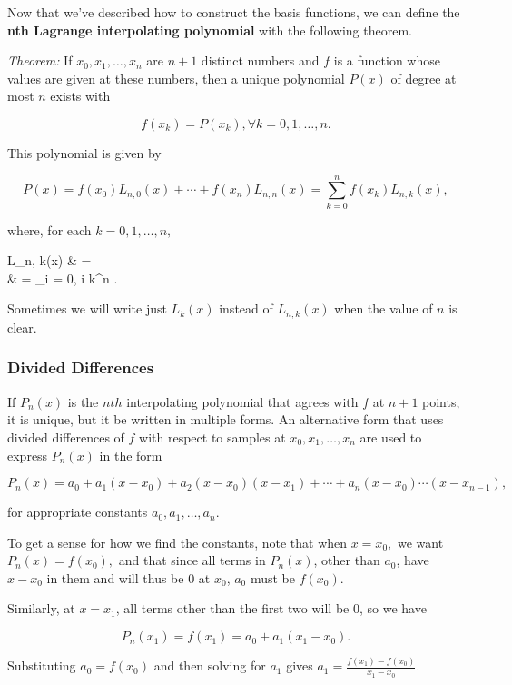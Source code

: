 \documentclass{article}
\begin{document}
Now that we've described how to construct the basis functions, we can define the \textbf{nth Lagrange interpolating polynomial} with the following theorem.

\emph{Theorem:} If $x_0, x_1, \dots, x_n$ are $n+1$ distinct numbers and $f$ is a function whose values are given at these numbers, then a unique polynomial $P(x)$ of degree at most $n$ exists with

\[ f(x_k) = P(x_k), \forall k = 0, 1,\dots,n. \]

This polynomial is given by

\[ P(x) = f(x_0)L_{n,0}(x) + \cdots + f(x_n)L_{n,n}(x) = \sum_{k=0}^{n} f(x_k)L_{n,k}(x), \]

where, for each $k = 0, 1, \dots, n,$

\bal L_{n, k}(x) & =  \\
& = \prod_{i = 0, i \neq k}^{n} . \eal

Sometimes we will write just $L_k(x)$ instead of $L_{n,k}(x)$ when the value of $n$ is clear.

\subsubsection{Divided Differences}

If $P_n(x)$ is the $nth$ interpolating polynomial that agrees with $f$ at $n+1$ points, it is unique, but it be written in multiple forms. An alternative form that uses divided differences of $f$ with respect to samples at $x_0, x_1, \dots, x_n$ are used to express $P_n(x)$ in the form

\[ P_n(x) = a_0 + a_1(x - x_0) + a_2(x - x_0)(x - x_1) + \cdots + a_n (x - x_0) \cdots (x - x_{n-1}), \]

for appropriate constants $a_0, a_1, \dots, a_n.$

To get a sense for how we find the constants, note that when $x = x_0,$ we want $P_n(x) = f(x_0),$ and that since all terms in $P_n(x)$, other than $a_0$, have $x-x_0$ in them and will thus be 0 at $x_0$, $a_0$ must be $f(x_0).$

Similarly, at $x = x_1$, all terms other than the first two will be 0, so we have

\[ P_n(x_1) = f(x_1) = a_0 + a_1(x_1 - x_0). \]

Substituting $a_0 = f(x_0)$ and then solving for $a_1$ gives $a_1 = \frac{f(x_1) - f(x_0)}{x_1 - x_0}.$
\end{document}
